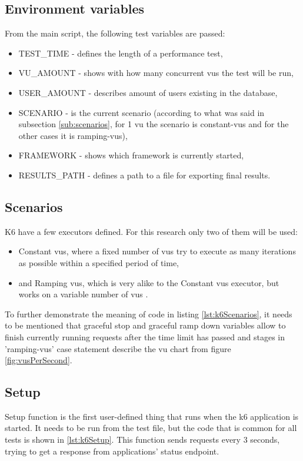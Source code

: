\subsection{Environment variables}
From the main script, the following test variables are passed:
\begin{itemize}
    \item TEST\_TIME - defines the length of a performance test,
    \item VU\_AMOUNT - shows with how many concurrent \acrshort{vu}s the test will be run,
    \item USER\_AMOUNT - describes amount of users existing in the database,
    \item SCENARIO - is the current scenario (according to what was said in subsection \ref{sub:scenarios}, for 1 \acrshort{vu} the scenario is constant-vus and for the other cases it is ramping-vus),
    \item FRAMEWORK - shows which framework is currently started,
    \item RESULTS\_PATH - defines a path to a file for exporting final results.
\end{itemize}

\subsection{Scenarios}
K6 have a few executors defined. For this research only two of them will be used:
\begin{itemize}
    \item Constant \acrshort{vu}s, where a fixed number of \acrlong{vu}s try to execute as many iterations as possible within a specified period of time,
    \item and Ramping \acrshort{vu}s, which is very alike to the Constant \acrshort{vu}s executor, but works on a variable number of \acrlong{vu}s \cite{k6Executors}.
\end{itemize}
To further demonstrate the meaning of code in listing \ref{lst:k6Scenarios}, it needs to be mentioned that graceful stop and graceful ramp down variables allow to finish currently running requests after the time limit has passed and stages in 'ramping-vus' case statement describe the \acrshort{vu} chart from figure \ref{fig:vusPerSecond}.


\subsection{Setup}
Setup function is the first user-defined thing that runs when the k6 application is started. It needs to be run from the test file, but the code that is common for all tests is shown in \ref{lst:k6Setup}. This function sends requests every 3 seconds, trying to get a response from applications' status endpoint.


